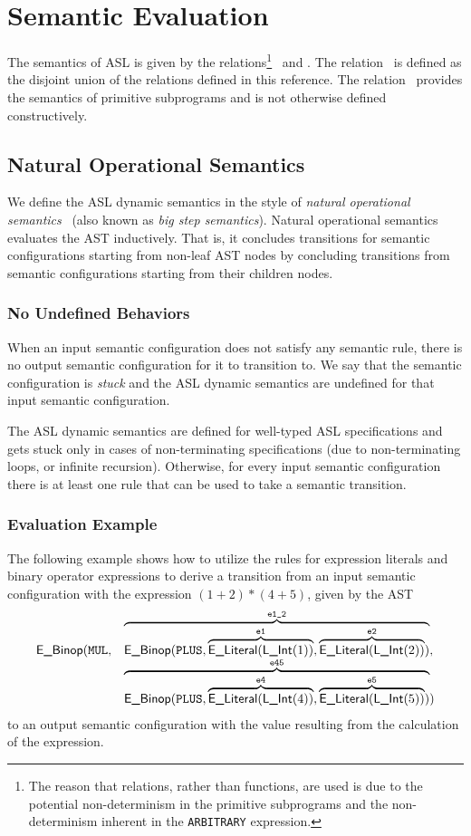 \section{Semantic Evaluation}
\hypertarget{def-evalrel}{}
\hypertarget{def-primitiverel}{}
The semantics of ASL is given by the relations\footnote{The reason that relations, rather than functions, are used is due to the
potential non-determinism in the primitive subprograms
and the non-determinism inherent in the \texttt{ARBITRARY} expression.}
\evalrel\ and \primitiverel.
The relation \evalrel\ is defined as the disjoint union of the relations defined in this reference.
The relation \primitiverel\ provides the semantics of primitive subprograms and is not otherwise defined
constructively.

\subsection{Natural Operational Semantics}
We define the ASL dynamic semantics in the style of \emph{natural operational semantics}~\cite{SemanticsWithApplicationsBook}
(also known as \emph{big step semantics}).
Natural operational semantics evaluates the AST inductively.
That is, it concludes transitions for semantic configurations starting from
non-leaf AST nodes by concluding transitions from semantic configurations starting from their children nodes.

\subsubsection{No Undefined Behaviors}
When an input semantic configuration does not satisfy any semantic rule,
there is no output semantic configuration for it to transition to. We say that
the semantic configuration is \emph{stuck} and the ASL dynamic semantics are undefined for that
input semantic configuration.

The ASL dynamic semantics are defined for well-typed ASL specifications
and gets stuck only in cases of non-terminating specifications
(due to non-terminating loops, or infinite recursion).
Otherwise, for every input semantic configuration there is at least one rule that can be used to take a semantic transition.

\hypertarget{eval-example}{}
\subsubsection{Evaluation Example}
\newcommand\elint[1]{\ELiteral(\lint(#1))}
The following example shows how to utilize the rules for expression literals and binary operator expressions
to derive a transition from an input semantic configuration with the expression $(1+2)*(4+5)$,
given by the AST
\[
  \begin{array}{rl}
  \EBinop(\MUL, &\overname{\EBinop(\PLUS, \overname{\elint{1}}{\veone}, \overname{\elint{2}}{\vetwo})}{\veonetwo}, \\
                &\overname{\EBinop(\PLUS, \overname{\elint{4}}{\vefour}, \overname{\elint{5}}{\vefive})}{\vefourfive})
  \end{array}
\]
to an output semantic configuration with the value resulting from the calculation of the expression.

